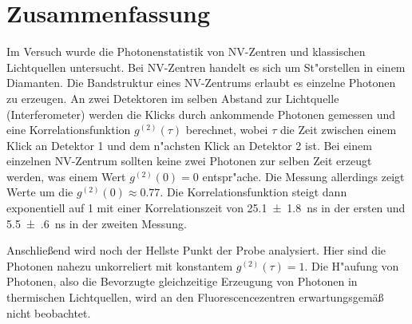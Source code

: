 \section{Zusammenfassung}
Im Versuch wurde die Photonenstatistik von NV-Zentren und klassischen Lichtquellen untersucht.
Bei NV-Zentren handelt es sich um St"orstellen in einem Diamanten.
Die Bandstruktur eines NV-Zentrums erlaubt es einzelne Photonen zu erzeugen.
An zwei Detektoren im selben Abstand zur Lichtquelle (Interferometer) werden die Klicks durch ankommende Photonen gemessen und eine Korrelationsfunktion $g^{(2)}(\tau)$ berechnet, wobei $\tau$ die Zeit zwischen einem Klick an Detektor 1 und dem n"achsten Klick an Detektor 2 ist.
Bei einem einzelnen NV-Zentrum sollten keine zwei Photonen zur selben Zeit erzeugt werden, was einem Wert $g^{(2)}(0)=0$ entspr"ache.
Die Messung allerdings zeigt Werte um die $g^{(2)}(0)\approx 0.77$.
Die Korrelationsfunktion steigt dann exponentiell auf 1 mit einer Korrelationszeit von \SI{25.1(18)}{\nano\second} in der ersten und \SI{5.5(6)}{\nano\second} in der zweiten Messung.

Anschlie\ss end wird noch der Hellste Punkt der Probe analysiert.
Hier sind die Photonen nahezu unkorreliert mit konstantem $g^{(2)}(\tau)=1$.
Die H"aufung von Photonen, also die Bevorzugte gleichzeitige Erzeugung von Photonen in thermischen  Lichtquellen, wird an den Fluorescencezentren erwartungsgemäß nicht beobachtet.
